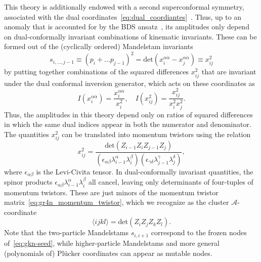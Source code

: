 \documentclass[11pt]{article}
\def\ket#1{\langle #1 \rangle}
\def\acoord{$\mathcal{A}$-coordinate}
\begin{document}
This theory is additionally endowed with a second superconformal symmetry, associated with the dual coordinates~\eqref{eq:dual_coordiantes}~\cite{Drummond:2006rz,Bern:2006ew,Bern:2007ct,Alday:2007hr,Drummond:2008vq}. Thus, up to an anomaly that is accounted for by the BDS ansatz~\cite{}, its amplitudes only depend on dual-conformally invariant combinations of kinematic invariants. These can be formed out of the (cyclically ordered) Mandelstam invariants
\begin{equation} 
s_{i,\dots,j-1} \equiv (p_i + \dots p_{j-1})^2= \text{det}(x_i^{\alpha \dot \alpha} - x_j^{\alpha \dot \alpha}) \equiv x_{ij}^2 \label{eq:mandelstam_dual_coord}
\end{equation}
by putting together combinations of the squared differences $x_{ij}^2$ that are invariant under the dual conformal inversion generator, which acts on these coordinates as
\begin{equation}
I( x_i^{\alpha \dot \alpha}) = \frac{x_i^{\alpha \dot \alpha}}{x_i^2}, \quad  I(x_{ij}^2) = \frac{x_{ij}^2}{x_i^2 x_j^2}.
\end{equation}
Thus, the amplitudes in this theory depend only on ratios of squared differences in which the same dual indices appear in both the numerator and denominator. The quantities $x_{ij}^2$ can be translated into momentum twistors using the relation
\begin{equation}
x_{ij}^2 = \frac{\text{det}(Z_{i-1} Z_i Z_{j-1} Z_j)}{(\epsilon_{\alpha \beta} \lambda^\alpha_{i-1} \lambda^\beta_i) (\epsilon_{\gamma \delta} \lambda^\gamma_{j-1} \lambda^\delta_j)},
\end{equation}
where $\epsilon_{\alpha \beta}$ is the Levi-Civita tensor. In dual-conformally invariant quantities, the spinor products $\epsilon_{\alpha \beta} \lambda^\alpha_{i-1} \lambda^\beta_i$ all cancel, leaving only determinants of four-tuples of momentum twistors. These are just minors of the momentum twistor matrix~\eqref{eq:gr4n_momentum_twistor}, which we recognize as the cluster \acoord  
\begin{equation}
\ket{i j k l} = \text{det}(Z_i Z_j Z_k Z_l).
\end{equation}
Note that the two-particle Mandelstams $s_{i,i+1}$ correspond to the frozen nodes of~\eqref{eq:gkn-seed}, while higher-particle Mandelstams and more general (polynomials of) Pl\"ucker coordinates can appear as mutable nodes.
\end{document}
